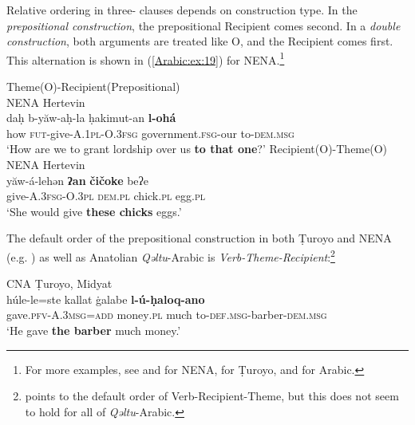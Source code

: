 \documentclass[output=paper,colorlinks,citecolor=brown,draftmode]{langscibook}
\begin{document}
Relative  ordering in three- clauses depends on construction type. In the \textit{prepositional  construction}, the prepositional Recipient comes second. In a \textit{double  construction}, both arguments are treated like O, and the Recipient comes first. This alternation is shown in (\ref{Arabic:ex:19}) for NENA.\footnote{For more examples, see  \citep{Coghill2014} and \citet[144--153]{Noorlander2018Alignment} for NENA, \citet{Waltisberg2016STuroyo} for Ṭuroyo, \citet{CamilleriElSadekSadler2014ADat} and \citet{Birnstiel2022CopulaKA} for Arabic.}

\ea\label{Arabic:ex:19}
\ea\label{Arabic:ex:19a}
Theme(O)-Recipient(Prepositional)\\
NENA Hertevin \citep[§437]{Jastrow1988NAHertevin} \\
\gll daḥ b-yăw-aḥ-la ḥakimut-an \textbf{l-ohá} \\
     how \textsc{fut}-give-\textsc{A.1pl-O.3fsg} government\textsc{.fsg-}our to-\textsc{dem.msg} \\
\glt `How are we to grant lordship over us \textbf{to that one}?'
\ex\label{Arabic:ex:19b}
Recipient(O)-Theme(O)\\
NENA Hertevin \citep[§437]{Jastrow1988NAHertevin} \\
\gll yăw-á-lehən \textbf{ʔan} \textbf{čičoke} beʔe \\
     give\textsc{-A.3fsg-O.3pl} \textsc{dem.pl} chick\textsc{.pl} egg\textsc{.pl} \\
\glt `She would give \textbf{these chicks} eggs.'
\z
\z

The default order of the prepositional  construction in both Ṭuroyo \citep[298]{Waltisberg2016STuroyo} and NENA (e.g. \citealt[251]{NoorlanderMolin2022WordOrder}) as well as Anatolian \textit{Qəltu}-Arabic is \textit{Verb-Theme-Recipient}:\footnote{\citet[218--230]{Birnstiel2022CopulaKA} points to the default order of Verb-Recipient-Theme, but this does not seem to hold for all of \textit{Qəltu}-Arabic.}

\ea\label{Arabic:ex:20}
CNA Ṭuroyo, Midyat \citep[27:§30]{Ritter1967Turoyo} \\
\gll húle-le=ste kallat ġalabe \textbf{l-ú-ḥaloq-ano} \\
     gave\textsc{.pfv-A.3msg=add} money\textsc{.pl} much to\textsc{-def.msg}-barber\textsc{-dem.msg} \\
\glt `He gave \textbf{the barber} much money.'
\z
\end{document}
